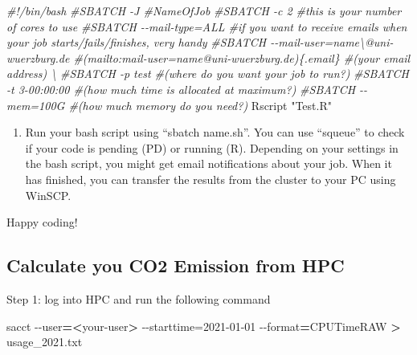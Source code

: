 \documentclass[
]{book}
\newenvironment{Shaded}{\begin{snugshade}}{\end{snugshade}}
\newcommand{\AttributeTok}[1]{\textcolor[rgb]{0.13,0.29,0.53}{#1}}
\newcommand{\CommentTok}[1]{\textcolor[rgb]{0.56,0.35,0.01}{\textit{#1}}}
\newcommand{\ExtensionTok}[1]{#1}
\newcommand{\NormalTok}[1]{#1}
\newcommand{\OperatorTok}[1]{\textcolor[rgb]{0.81,0.36,0.00}{\textbf{#1}}}
\newcommand{\StringTok}[1]{\textcolor[rgb]{0.31,0.60,0.02}{#1}}
\providecommand{\tightlist}{%
  \setlength{\itemsep}{0pt}\setlength{\parskip}{0pt}}
\begin{document}
\begin{Shaded}
\begin{Highlighting}[]
    \CommentTok{\#!/bin/bash}
    \CommentTok{\#SBATCH {-}J \#NameOfJob}
    \CommentTok{\#SBATCH {-}c 2 \#this is your number of cores to use }
    \CommentTok{\#SBATCH {-}{-}mail{-}type=ALL \#if you want to receive emails when your job starts/fails/finishes, very handy}
    \CommentTok{\#SBATCH {-}{-}mail{-}user=name\textbackslash{}@uni{-}wuerzburg.de \#(mailto:mail{-}user=name@uni{-}wuerzburg.de)\{.email\} \#(your email address) \textbackslash{}}
    \CommentTok{\#SBATCH {-}p test \#(where do you want your job to run?)}
    \CommentTok{\#SBATCH {-}t 3{-}00:00:00 \#(how much time is allocated at maximum?) }
    \CommentTok{\#SBATCH {-}{-}mem=100G \#(how much memory do you need?) }
    \ExtensionTok{Rscript} \StringTok{"Test.R"}
\end{Highlighting}
\end{Shaded}

\begin{enumerate}
\def\labelenumi{\arabic{enumi}.}
\setcounter{enumi}{4}
\tightlist
\item
  Run your bash script using ``sbatch name.sh''. You can use ``squeue'' to
  check if your code is pending (PD) or running (R). Depending on your
  settings in the bash script, you might get email notifications about
  your job. When it has finished, you can transfer the results from
  the cluster to your PC using WinSCP.
\end{enumerate}

Happy coding!

\subsection{Calculate you CO2 Emission from HPC}\label{calculate-you-co2-emission-from-hpc}

Step 1: log into HPC and run the following command

\begin{Shaded}
\begin{Highlighting}[]
\ExtensionTok{sacct} \AttributeTok{{-}{-}user}\OperatorTok{=\textless{}}\NormalTok{your{-}user}\OperatorTok{\textgreater{}}\NormalTok{ {-}{-}starttime=2021{-}01{-}01 }\AttributeTok{{-}{-}format}\OperatorTok{=}\StringTok{\textquotesingle{}CPUTimeRAW\textquotesingle{}} \OperatorTok{\textgreater{}}\NormalTok{ usage\_2021.txt}
\end{Highlighting}
\end{Shaded}
\end{document}
